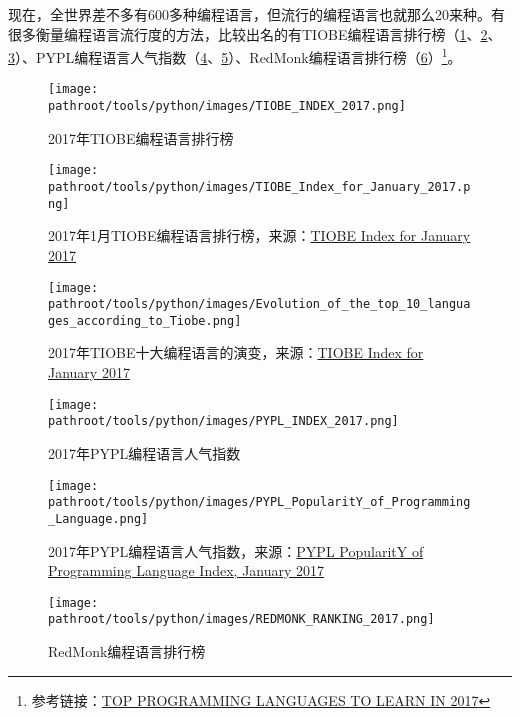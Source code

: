 \documentclass[10pt,a4paper]{ctexbook}
\providecommand{\pathroot}{../..}
\begin{document}
现在，全世界差不多有600多种编程语言，但流行的编程语言也就那么20来种。有很多衡量编程语言流行度的方法，比较出名的有TIOBE编程语言排行榜（\ref{fig:TIOBE_INDEX_2017}、\ref{fig:TIOBE_Index_for_January_2017}、\ref{fig:TIOBE_Top10_LANGUAGE_EVOLUTION}）、PYPL编程语言人气指数（\ref{fig:PYPL_INDEX_2017}、\ref{fig:PYPL_PopularitY_of_Programming_Language}）、RedMonk编程语言排行榜（\ref{fig:REDMONK_RANKING_2017}）\footnote{参考链接：\href{https://www.codingame.com/blog/top-programming-languages-to-learn-in-2017/}{TOP PROGRAMMING LANGUAGES TO LEARN IN 2017}}。

\begin{figure}[ht]
  \centering
  \texttt{[image: \\pathroot/tools/python/images/TIOBE\_INDEX\_2017.png]}
  \caption{2017年TIOBE编程语言排行榜}
  \label{fig:TIOBE_INDEX_2017}
\end{figure}

\begin{figure}[ht]
  \centering
  \texttt{[image: \\pathroot/tools/python/images/TIOBE\_Index\_for\_January\_2017.png]}
  \caption{2017年1月TIOBE编程语言排行榜，来源：\href{http://www.tiobe.com/tiobe-index//}{TIOBE Index for January 2017}}
  \label{fig:TIOBE_Index_for_January_2017}
\end{figure}

\begin{figure}[ht]
  \centering
  \texttt{[image: \\pathroot/tools/python/images/Evolution\_of\_the\_top\_10\_languages\_according\_to\_Tiobe.png]}
  \caption{2017年TIOBE十大编程语言的演变，来源：\href{http://www.tiobe.com/tiobe-index//}{TIOBE Index for January 2017}}
  \label{fig:TIOBE_Top10_LANGUAGE_EVOLUTION}
\end{figure}

\begin{figure}[ht]
  \centering
  \texttt{[image: \\pathroot/tools/python/images/PYPL\_INDEX\_2017.png]}
  \caption{2017年PYPL编程语言人气指数}
  \label{fig:PYPL_INDEX_2017}
\end{figure}

\begin{figure}[ht]
  \centering
  \texttt{[image: \\pathroot/tools/python/images/PYPL\_PopularitY\_of\_Programming\_Language.png]}
  \caption{2017年PYPL编程语言人气指数，来源：\href{http://pypl.github.io/PYPL.html}{PYPL PopularitY of Programming Language Index, January 2017}}
  \label{fig:PYPL_PopularitY_of_Programming_Language}
\end{figure}


\begin{figure}[ht]
  \centering
  \texttt{[image: \\pathroot/tools/python/images/REDMONK\_RANKING\_2017.png]}
  \caption{RedMonk编程语言排行榜}
  \label{fig:REDMONK_RANKING_2017}
\end{figure}
\end{document}
